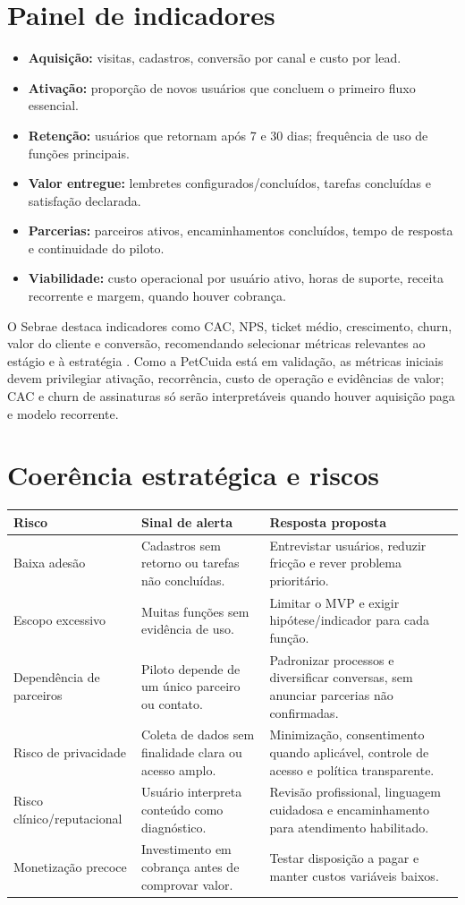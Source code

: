 \documentclass[12pt,a4paper]{article}
\begin{document}
\section{Painel de indicadores}
\begin{itemize}[leftmargin=*]
\item \textbf{Aquisição:} visitas, cadastros, conversão por canal e custo por lead.
\item \textbf{Ativação:} proporção de novos usuários que concluem o primeiro fluxo essencial.
\item \textbf{Retenção:} usuários que retornam após 7 e 30 dias; frequência de uso de funções principais.
\item \textbf{Valor entregue:} lembretes configurados/concluídos, tarefas concluídas e satisfação declarada.
\item \textbf{Parcerias:} parceiros ativos, encaminhamentos concluídos, tempo de resposta e continuidade do piloto.
\item \textbf{Viabilidade:} custo operacional por usuário ativo, horas de suporte, receita recorrente e margem, quando houver cobrança.
\end{itemize}
O Sebrae destaca indicadores como CAC, NPS, ticket médio, crescimento, churn, valor do cliente e conversão, recomendando selecionar métricas relevantes ao estágio e à estratégia \cite{sebrae_metrics}. Como a PetCuida está em validação, as métricas iniciais devem privilegiar ativação, recorrência, custo de operação e evidências de valor; CAC e churn de assinaturas só serão interpretáveis quando houver aquisição paga e modelo recorrente.

\section{Coerência estratégica e riscos}
\begin{longtable}{p{}p{}p{}}
\toprule
\textbf{Risco} & \textbf{Sinal de alerta} & \textbf{Resposta proposta}\\
\midrule
Baixa adesão & Cadastros sem retorno ou tarefas não concluídas. & Entrevistar usuários, reduzir fricção e rever problema prioritário.\\
Escopo excessivo & Muitas funções sem evidência de uso. & Limitar o MVP e exigir hipótese/indicador para cada função.\\
Dependência de parceiros & Piloto depende de um único parceiro ou contato. & Padronizar processos e diversificar conversas, sem anunciar parcerias não confirmadas.\\
Risco de privacidade & Coleta de dados sem finalidade clara ou acesso amplo. & Minimização, consentimento quando aplicável, controle de acesso e política transparente.\\
Risco clínico/reputacional & Usuário interpreta conteúdo como diagnóstico. & Revisão profissional, linguagem cuidadosa e encaminhamento para atendimento habilitado.\\
Monetização precoce & Investimento em cobrança antes de comprovar valor. & Testar disposição a pagar e manter custos variáveis baixos.\\
\bottomrule
\end{longtable}
\end{document}
